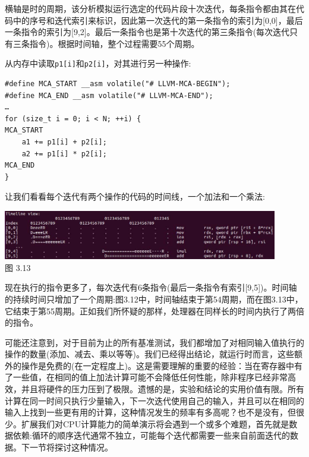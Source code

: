 横轴是时的周期，该分析模拟运行选定的代码片段十次迭代，每条指令都由其在代码中的序号和迭代索引来标识，因此第一次迭代的第一条指令的索引为[0,0]，最后一条指令的索引为[9,2]。最后一条指令也是第十次迭代的第三条指令(每次迭代只有三条指令)。根据时间轴，整个过程需要55个周期。

从内存中读取\texttt{p1[i]}和\texttt{p2[i]}，对其进行另一种操作:

\begin{lstlisting}[style=styleCXX]
#define MCA_START __asm volatile("# LLVM-MCA-BEGIN");
#define MCA_END __asm volatile("# LLVM-MCA-END");
…
for (size_t i = 0; i < N; ++i) {
MCA_START
	a1 += p1[i] + p2[i];
	a2 += p1[i] * p2[i];
MCA_END
}
\end{lstlisting}

让我们看看每个迭代有两个操作的代码的时间线，一个加法和一个乘法:

\begin{center}
\includegraphics[width=0.9\textwidth]{content/1/chapter3/images/13.jpg}\\
图 3.13
\end{center}

现在执行的指令更多了，每次迭代有6条指令(最后一条指令有索引[9,5])。时间轴的持续时间只增加了一个周期:图3.12中，时间轴结束于第54周期，而在图3.13中，它结束于第55周期。正如我们所怀疑的那样，处理器在同样长的时间内执行了两倍的指令。

可能还注意到，对于目前为止的所有基准测试，我们都增加了对相同输入值执行的操作的数量(添加、减去、乘以等等)。我们已经得出结论，就运行时而言，这些额外的操作是免费的(在一定程度上)。这是需要理解的重要的经验：当在寄存器中有了一些值，在相同的值上加法计算可能不会降低任何性能，除非程序已经非常高效，并且将硬件的压力压到了极限。遗憾的是，实验和结论的实用价值有限。所有计算在同一时间只执行少量输入，下一次迭代使用自己的输入，并且可以在相同的输入上找到一些更有用的计算，这种情况发生的频率有多高呢？也不是没有，但很少。扩展我们对CPU计算能力的简单演示将会遇到一个或多个难题，首先就是数据依赖:循环的顺序迭代通常不独立，可能每个迭代都需要一些来自前面迭代的数据。下一节将探讨这种情况。

















